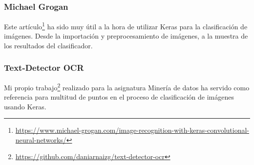 \subsubsection{Michael Grogan }
Este artículo\footnote{\url{https://www.michael-grogan.com/image-recognition-with-keras-convolutional-neural-networks/}} ha sido muy útil a la hora de utilizar Keras para la clasificación de imágenes. Desde la importación y preprocesamiento de imágenes, a la muestra de los resultados del clasificador.

\subsubsection{Text-Detector OCR}
Mi propio trabajo\footnote{\url{https://github.com/daniarnaizg/text-detector-ocr}} realizado para la asignatura Minería de datos ha servido como referencia para multitud de puntos en el proceso de clasificación de imágenes usando Keras.
